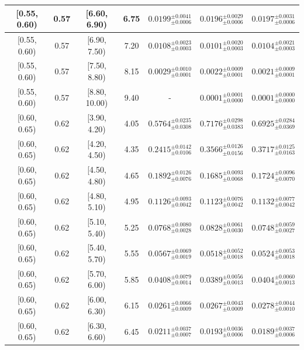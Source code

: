 \begin{longtable}{|c|c|c|c|c|c|c|}
\hline
[0.55, 0.60) & 0.57 & [6.60, 6.90) & 6.75 & $0.0199^{ \pm 0.0041 }_{ \pm 0.0006 }$ & $0.0196^{ \pm 0.0029 }_{ \pm 0.0006 }$ & $0.0197^{ \pm 0.0031 }_{ \pm 0.0006 }$ \\ 
\hline
[0.55, 0.60) & 0.57 & [6.90, 7.50) & 7.20 & $0.0108^{ \pm 0.0023 }_{ \pm 0.0003 }$ & $0.0101^{ \pm 0.0020 }_{ \pm 0.0003 }$ & $0.0104^{ \pm 0.0021 }_{ \pm 0.0003 }$ \\ 
\hline
[0.55, 0.60) & 0.57 & [7.50, 8.80) & 8.15 & $0.0029^{ \pm 0.0010 }_{ \pm 0.0001 }$ & $0.0022^{ \pm 0.0009 }_{ \pm 0.0001 }$ & $0.0021^{ \pm 0.0009 }_{ \pm 0.0001 }$ \\ 
\hline
[0.55, 0.60) & 0.57 & [8.80, 10.00) & 9.40 & - & $0.0001^{ \pm 0.0001 }_{ \pm 0.0000 }$ & $0.0001^{ \pm 0.0000 }_{ \pm 0.0000 }$ \\ 
\hline
[0.60, 0.65) & 0.62 & [3.90, 4.20) & 4.05 & $0.5764^{ \pm 0.0235 }_{ \pm 0.0308 }$ & $0.7176^{ \pm 0.0298 }_{ \pm 0.0383 }$ & $0.6925^{ \pm 0.0284 }_{ \pm 0.0369 }$ \\ 
\hline
[0.60, 0.65) & 0.62 & [4.20, 4.50) & 4.35 & $0.2415^{ \pm 0.0142 }_{ \pm 0.0106 }$ & $0.3566^{ \pm 0.0126 }_{ \pm 0.0156 }$ & $0.3717^{ \pm 0.0125 }_{ \pm 0.0163 }$ \\ 
\hline
[0.60, 0.65) & 0.62 & [4.50, 4.80) & 4.65 & $0.1892^{ \pm 0.0126 }_{ \pm 0.0076 }$ & $0.1685^{ \pm 0.0093 }_{ \pm 0.0068 }$ & $0.1724^{ \pm 0.0096 }_{ \pm 0.0070 }$ \\ 
\hline
[0.60, 0.65) & 0.62 & [4.80, 5.10) & 4.95 & $0.1126^{ \pm 0.0093 }_{ \pm 0.0042 }$ & $0.1123^{ \pm 0.0076 }_{ \pm 0.0042 }$ & $0.1132^{ \pm 0.0077 }_{ \pm 0.0042 }$ \\ 
\hline
[0.60, 0.65) & 0.62 & [5.10, 5.40) & 5.25 & $0.0768^{ \pm 0.0080 }_{ \pm 0.0028 }$ & $0.0828^{ \pm 0.0061 }_{ \pm 0.0030 }$ & $0.0748^{ \pm 0.0059 }_{ \pm 0.0027 }$ \\ 
\hline
[0.60, 0.65) & 0.62 & [5.40, 5.70) & 5.55 & $0.0567^{ \pm 0.0069 }_{ \pm 0.0019 }$ & $0.0518^{ \pm 0.0052 }_{ \pm 0.0018 }$ & $0.0524^{ \pm 0.0053 }_{ \pm 0.0018 }$ \\ 
\hline
[0.60, 0.65) & 0.62 & [5.70, 6.00) & 5.85 & $0.0408^{ \pm 0.0079 }_{ \pm 0.0014 }$ & $0.0389^{ \pm 0.0056 }_{ \pm 0.0013 }$ & $0.0404^{ \pm 0.0060 }_{ \pm 0.0013 }$ \\ 
\hline
[0.60, 0.65) & 0.62 & [6.00, 6.30) & 6.15 & $0.0261^{ \pm 0.0066 }_{ \pm 0.0009 }$ & $0.0267^{ \pm 0.0043 }_{ \pm 0.0009 }$ & $0.0278^{ \pm 0.0044 }_{ \pm 0.0010 }$ \\ 
\hline
[0.60, 0.65) & 0.62 & [6.30, 6.60) & 6.45 & $0.0211^{ \pm 0.0037 }_{ \pm 0.0007 }$ & $0.0193^{ \pm 0.0036 }_{ \pm 0.0006 }$ & $0.0189^{ \pm 0.0037 }_{ \pm 0.0006 }$ \\ 

\end{longtable}
